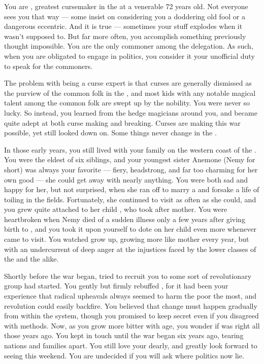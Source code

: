 \documentclass[char]{GL2020}
\begin{document}
\name{\cCurse{}}

You are \cCurse{\intro}, greatest cursemaker in the \pFarm{} at a venerable 72 years old. Not everyone sees you that way — some insist on considering you a doddering old fool or a dangerous eccentric. And it is true — sometimes your stuff explodes when it wasn't supposed to. But far more often, you accomplish something previously thought impossible. You are the only commoner among the \pFarm{} delegation. As such, when you are obligated to engage in politics, you consider it your unofficial duty to speak for the commoners.

The problem with being a curse expert is that curses are generally dismissed as the purview of the common folk in the \pFarm{}, and most kids with any notable magical talent among the common folk are swept up by the nobility. You were never so lucky. So instead, you learned from the hedge magicians around you, and became quite adept at both curse making and breaking. Curses are making this war possible, yet still looked down on. Some things never change in the \pFarm{}.

In those early years, you still lived with your family on the western coast of the \pFarm{}. You were the eldest of six siblings, and your youngest sister Anemone (Nemy for short) was always your favorite — fiery, headstrong, and far too charming for her own good — she could get away with nearly anything. You were both sad and happy for her, but not surprised, when she ran off to marry a \pShippie{} and forsake a life of toiling in the fields. Fortunately, she continued to visit as often as she could, and you grew quite attached to her child \cChupLeader{\intro}, who took after \cChupLeader{\their} mother. You were heartbroken when Nemy died of a sudden illness only a few years after giving birth to \cChupLeader{}, and you took it upon yourself to dote on her child even more whenever \cChupLeader{\they} came to visit. You watched \cChupLeader{\them} grow up, growing more like \cChupLeader{\their} mother every year, but with an undercurrent of deep anger at the injustices faced by the lower classes of the \pFarm{} and the \pShip{} alike. 

Shortly before the war began, \cChupLeader{\they} tried to recruit you to some sort of revolutionary group \cChupLeader{\they} had started. You gently but firmly rebuffed \cChupLeader{\them}, for it had been your experience that radical upheavals always seemed to harm the poor the most, and revolution could easily backfire. You believed that change must happen gradually from within the system, though you promised to keep \cChupLeader{\their} secret even if you disagreed with \cChupLeader{\their} methods. Now, as you grow more bitter with age, you wonder if \cChupLeader{} was right all those years ago. You kept in touch until the war began six years ago, tearing nations and families apart. You still love your \cChupLeader{\nibling} dearly, and greatly look forward to seeing \cChupLeader{\them} this weekend. You are undecided if you will ask where \cChupLeader{\their} politics now lie.
\end{document}
